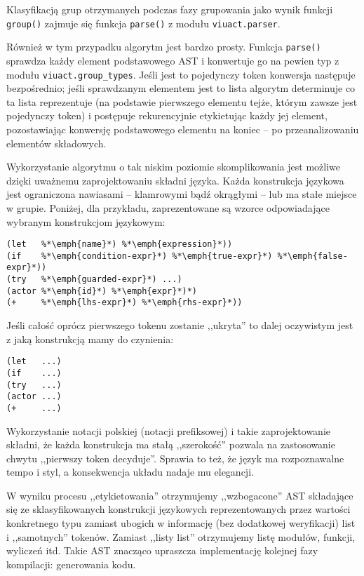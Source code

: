 Klasyfikacją grup otrzymanych podczas fazy grupowania jako wynik funkcji
\texttt{group()} zajmuje się funkcja \texttt{parse()} z modułu \texttt{viuact.parser}.

Również w tym przypadku algorytm jest bardzo prosty. Funkcja \texttt{parse()}
sprawdza każdy element podstawowego AST i konwertuje go na pewien typ z modułu
\texttt{viuact.group\_types}. Jeśli jest to pojedynczy token konwersja następuje
bezpośrednio; jeśli sprawdzanym elementem jest to lista algorytm determinuje co
ta lista reprezentuje (na podstawie pierwszego elementu tejże, którym zawsze
jest pojedynczy token) i postępuje rekurencyjnie etykietując każdy jej element,
pozostawiając konwersję podstawowego elementu na koniec -- po przeanalizowaniu
elementów składowych.

Wykorzystanie algorytmu o tak niskim poziomie skomplikowania jest możliwe dzięki
uważnemu zaprojektowaniu składni języka. Każda konstrukcja językowa jest
ograniczona nawiasami -- klamrowymi bądź okrągłymi -- lub ma stałe miejsce w
grupie. Poniżej, dla przykładu, zaprezentowane są wzorce odpowiadające wybranym
konstrukcjom językowym:

\begin{lstlisting}
(let   %*\emph{name}*) %*\emph{expression}*))
(if    %*\emph{condition-expr}*) %*\emph{true-expr}*) %*\emph{false-expr}*))
(try   %*\emph{guarded-expr}*) ...)
(actor %*\emph{id}*) %*\emph{expr}*)*)
(+     %*\emph{lhs-expr}*) %*\emph{rhs-expr}*))
\end{lstlisting}

Jeśli całość oprócz pierwszego tokenu zostanie ,,ukryta'' to dalej oczywistym
jest z jaką konstrukcją mamy do czynienia:

\begin{lstlisting}
(let   ...)
(if    ...)
(try   ...)
(actor ...)
(+     ...)
\end{lstlisting}

Wykorzystanie notacji polskiej (notacji prefiksowej) i takie zaprojektowanie
składni, że każda konstrukcja ma stałą ,,szerokość'' pozwala na zastosowanie
chwytu ,,pierwszy token decyduje''. Sprawia to też, że język ma
rozpoznawalne tempo i styl, a konsekwencja układu nadaje mu elegancji.

\vspace{1em}

W wyniku procesu ,,etykietowania'' otrzymujemy ,,wzbogacone'' AST składające się
ze sklasyfikowanych konstrukcji językowych reprezentowanych przez wartości
konkretnego typu zamiast ubogich w informację (bez dodatkowej weryfikacji) list
i ,,samotnych'' tokenów. Zamiast ,,listy list'' otrzymujemy listę modułów,
funkcji, wyliczeń itd. Takie AST znacząco upraszcza implementację kolejnej fazy
kompilacji: generowania kodu.

